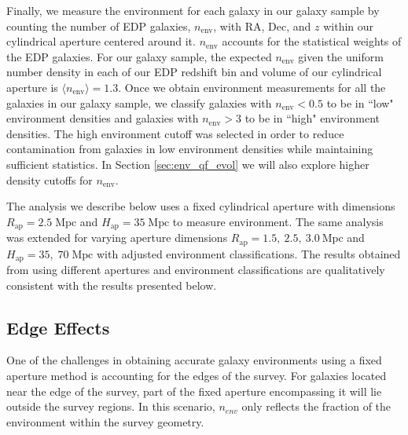 \documentclass{aastex}
\def \apradius{2.5}
\def \apheight{35}
\begin{document}
Finally, we measure the environment for each galaxy in our galaxy
sample by counting the number of EDP galaxies, $n_{\mathrm{env}}$, with RA,
Dec, and $z$ within our cylindrical aperture centered around
it. $n_{\mathrm{env}}$ accounts for the statistical weights of the EDP
galaxies. 
For our galaxy sample, the expected $n_{\mathrm{env}}$ given the uniform number density in 
each of our EDP redshift bin and volume of our cylindrical aperture is $\langle n_{\mathrm{env}} \rangle = 1.3$. 
Once we obtain environment measurements for all the galaxies
in our galaxy sample, we classify galaxies with $n_{\mathrm{env}} < 0.5$
to be in ``low" environment densities and galaxies with $n_{\mathrm{env}} > 3$
to be in ``high" environment densities. The high environment cutoff was
selected in order to reduce contamination from galaxies in low
environment densities while maintaining sufficient statistics. In
Section \ref{sec:env_qf_evol} we will also explore higher density
cutoffs for $n_{\mathrm{env}}$.

The analysis we describe below uses a fixed cylindrical aperture with
dimensions $R_{\mathrm{ap}} = \apradius \; \mathrm{Mpc}$ and $H_{\mathrm{ap}} = \apheight
\;\mathrm{Mpc}$ to measure environment. The same analysis was
extended for varying aperture dimensions $R_{\mathrm{ap}} = 1.5, \: \apradius, \:3.0 \:
\mathrm{Mpc}$ and $H_{\mathrm{ap}} = \apheight, \; 70 \;\mathrm{Mpc}$ with adjusted environment classifications. 
The results obtained from using different apertures and
environment classifications are qualitatively consistent with the results presented below.  

\subsection{Edge Effects} \label{sec:edgeeffect}
One of the challenges in obtaining accurate galaxy environments using a fixed aperture method is accounting for the edges of the survey. For galaxies located near the edge of the survey, part of the fixed aperture encompassing it will lie outside the survey regions. In this scenario, $n_{env}$ only reflects the fraction of the environment within the survey geometry.
\end{document}
